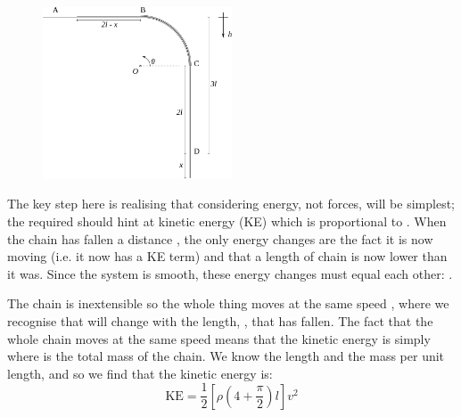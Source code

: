\begin{problem}
{\begin{enumerate}
\begin{figure}[h!]
\centering
\includegraphics[width=0.5\textwidth]{../../../figures/Dynamics_chain_sliding_labelled.svg}
\caption{}
\label{fig:Dynamics_chain_sliding_labelled}
\end{figure}

The key step here is realising that considering energy, not forces, will be simplest; the  required should hint at kinetic energy (KE) which is proportional to . When the chain has fallen a distance , the only energy changes are the fact it is now moving (i.e. it now has a KE term) and that a length  of chain is now lower than it was. Since the system is smooth, these energy changes must equal each other: .

The chain is inextensible so the whole thing moves at the same speed , where we recognise that  will change with the length, , that has fallen. The fact that the whole chain moves at the same speed means that the kinetic energy is simply  where  is the total mass of the chain. We know the length and the mass per unit length, and so we find that the kinetic energy is:
	\begin{equation*} 
	\text{KE} = \frac{1}{2}\left[\rho\left(4 + \frac{\pi}{2}\right)l\right]v^{2} 
	\end{equation*}


\end{enumerate}}
\end{problem}
